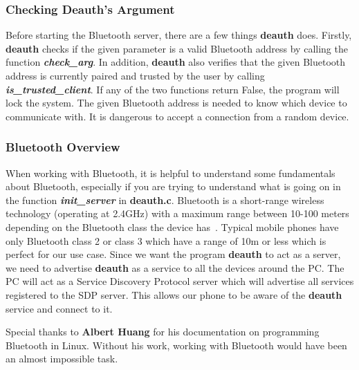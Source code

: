 \documentclass[letterpaper,twocolumn,10pt]{article}
\begin{document}
\subsubsection{Checking Deauth's Argument}
Before starting the Bluetooth server, there are a few things \textbf{deauth} does. Firstly, \textbf{deauth} checks if the given parameter is a valid Bluetooth address by calling the function \textbf{\emph{check\_arg}}. In addition, \textbf{deauth} also verifies that the given Bluetooth address is currently paired and trusted by the user by calling \textbf{\emph{is\_trusted\_client}}. If any of the two functions return False, the program will lock the system. The given Bluetooth address is needed to know which device to communicate with. It is dangerous to accept a connection from a random device.

\subsubsection{Bluetooth Overview} 
When working with Bluetooth, it is helpful to understand some fundamentals about Bluetooth, especially if you are trying to understand what is going on in the function \textbf{\emph{init\_server}} in \textbf{deauth.c}. Bluetooth is a short-range wireless technology (operating at 2.4GHz) with a maximum range between 10-100 meters depending on the Bluetooth class the device has~\cite{bluetooth_myths}. Typical mobile phones have only Bluetooth class 2 or class 3 which have a range of 10m or less which is perfect for our use case. Since we want the program \textbf{deauth} to act as a server, we need to advertise \textbf{deauth} as a service to all the devices around the PC. The PC will act as a Service Discovery Protocol server which will advertise all services registered to the SDP server. This allows our phone to be aware of the \textbf{deauth} service and connect to it.

Special thanks to \textbf{Albert Huang} for his documentation on programming Bluetooth in Linux. Without his work, working with Bluetooth would have been an almost impossible task.
\end{document}
